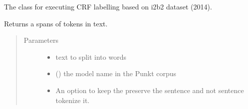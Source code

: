 \documentclass[letterpaper,10pt,english]{sphinxmanual}
\begin{document}

\begin{fulllineitems}
\label{\detokenize{index:ner_plugins.NER_CRF.NER_CRF}}
The class for executing CRF labelling based on i2b2 dataset (2014).

\begin{fulllineitems}
\label{\detokenize{index:ner_plugins.NER_CRF.NER_CRF.custom_span_tokenize}}
Returns a spans of tokens in text.
\begin{quote}\begin{description}
\item[{Parameters}] \leavevmode\begin{itemize}
\item {} 
 \textendash{} text to split into words

\item {} 
 () \textendash{} the model name in the Punkt corpus

\item {} 
 \textendash{} An option to keep the preserve the sentence and not sentence tokenize it.

\end{itemize}

\end{description}\end{quote}

\end{fulllineitems}



\end{fulllineitems}
\end{document}
